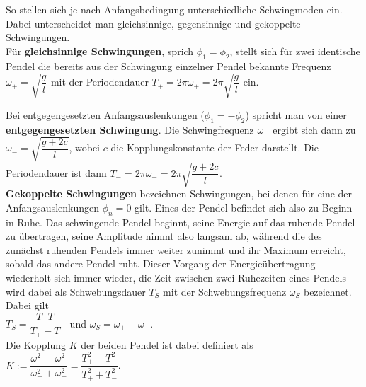 So stellen sich je nach Anfangsbedingung unterschiedliche Schwingmoden ein. Dabei unterscheidet man gleichsinnige, gegensinnige und gekoppelte Schwingungen. \\

Für \textbf{gleichsinnige Schwingungen}, sprich $\phi_1=\phi_2$, stellt sich für zwei identische Pendel die bereits aus der Schwingung einzelner Pendel bekannte Frequenz \\ 
$\omega_+=\sqrt{\dfrac{g}{l}}$ mit der Periodendauer $T_+ = 2\pi \omega_+ = 2\pi \sqrt{\dfrac{g}{l}}$ ein.
\newpage

\noindent Bei entgegengesetzten Anfangsauslenkungen ($\phi_1=-\phi_2$) spricht man von einer \\ 
\textbf{entgegengesetzten Schwingung}. Die Schwingfrequenz $\omega_-$ ergibt sich dann zu \\
$\omega_- = \sqrt{\dfrac{g+2c}{l}}$, wobei $c$ die Kopplungskonstante der Feder darstellt.
Die Periodendauer ist dann $T_- = 2 \pi \omega_- = 2 \pi \sqrt{\dfrac{g+2c}{l}}$. \\

\textbf{Gekoppelte Schwingungen} bezeichnen Schwingungen, bei denen für eine der Anfangsauslenkungen $\phi_n = 0$ gilt. Eines der Pendel befindet sich also zu Beginn in Ruhe.
Das schwingende Pendel beginnt, seine Energie auf das ruhende Pendel zu übertragen, seine Amplitude nimmt also langsam ab, während die des zunächst ruhenden Pendels immer weiter zunimmt und ihr Maximum erreicht, sobald das andere Pendel ruht.
Dieser Vorgang der Energieübertragung wiederholt sich immer wieder, die Zeit zwischen zwei Ruhezeiten eines Pendels wird dabei als Schwebungsdauer $T_S$ mit der Schwebungsfrequenz $\omega_S$ bezeichnet. \\
Dabei gilt \\

\noindent $T_S = \dfrac{T_+ T_-}{T_+ - T_-}$ und $\omega_S= \omega_+ -\omega_-$. \\

\noindent Die Kopplung $K$ der beiden Pendel ist dabei definiert als \\

\noindent $K := \dfrac{\omega_-^2-\omega_+^2}{\omega_-^2 + \omega_+^2} = \dfrac{T_+^2 - T_-^2}{T_+^2 + T_-^2}$.



